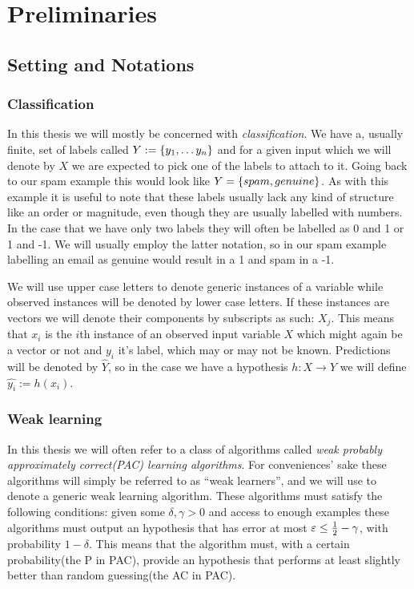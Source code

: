 
\chapter{Preliminaries}
\label{chap:prelim}
\section{Setting and Notations}
\subsection{Classification} 
\label{subsec:class}
\par {} In this thesis we will mostly be concerned with \textit{classification}\cite{Hastie2009}. We have a, usually finite, set of labels called $Y:=\left\{y_1,\ldots y_n\right\}$ and for a given input which we will denote by $X$ we are expected to pick one of the labels to attach to it. Going back to our spam example this would look like $Y=\left\{spam, genuine\right\}$. As with this example it is useful to note that these labels usually lack any kind of structure like an order or magnitude, even though they are usually labelled with numbers. In the case that we have only two labels they will often be labelled as 0 and 1 or 1 and -1. We will usually employ the latter notation, so in our spam example labelling an email as genuine would result in a 1 and spam in a -1. 

\par We will use upper case letters to denote generic instances of a variable while observed instances will be denoted by lower case letters. If these instances are vectors we will denote their components by subscripts as such: $X_j$. This means that $x_i$ is the $i$th instance of an observed input variable $X$ which might again be a vector or not and $y_i$ it's label, which may or may not be known.  Predictions will be denoted by $\hat Y$, so in the case we have a hypothesis $h:X\to Y$ we will define $\hat{y_i}:=h(x_i)$.  

\subsection{Weak learning}
\label{subsec:weak}
In this thesis we will often refer to a class of algorithms called \textit{weak probably approximately correct(PAC) learning algorithms}\cite{Freund1997}. For conveniences' sake these algorithms will simply be referred to as ``weak learners'', and we will use \weak to denote a generic weak learning algorithm. These algorithms must satisfy the following conditions: given some $\delta,\gamma >0$ and access to enough examples these algorithms must output an hypothesis that has error at most $\varepsilon \leq \frac12-\gamma$, with probability $1-\delta$. This means that the algorithm must, with a certain probability(the P in PAC), provide an hypothesis that performs at least slightly better than random guessing(the AC in PAC). 

